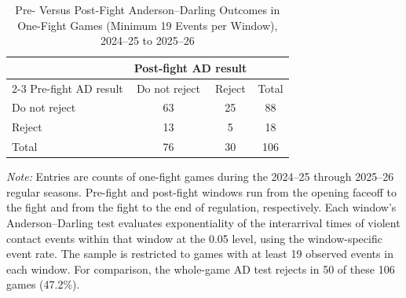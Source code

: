 \begin{table}[htbp]
\centering
\caption{Pre- Versus Post-Fight Anderson--Darling Outcomes in One-Fight Games (Minimum 19 Events per Window), 2024--25 to 2025--26}
\label{tab:one_fight_AD_rejection_min_19_20242025_20252026}
\small
\renewcommand{\arraystretch}{1.15}
\setlength{\tabcolsep}{6pt}

\begin{tabular*}{0.78\textwidth}{@{\extracolsep{\fill}}lccc}
\toprule
 & \multicolumn{2}{c}{Post-fight AD result} & \\
\cmidrule(lr){2-3}
Pre-fight AD result & Do not reject & Reject & Total \\
\midrule
Do not reject & 63 & 25 & 88 \\
Reject & 13 & 5 & 18 \\
\midrule
Total & 76 & 30 & 106 \\
\bottomrule
\end{tabular*}

\vspace{0.4em}
\parbox{0.78\textwidth}{
\footnotesize
\textit{Note:} Entries are counts of one-fight games during the 2024--25 through 2025--26 regular seasons. Pre-fight and post-fight windows run from the opening faceoff to the fight and from the fight to the end of regulation, respectively. Each window's Anderson--Darling test evaluates exponentiality of the interarrival times of violent contact events within that window at the 0.05 level, using the window-specific event rate. The sample is restricted to games with at least 19 observed events in each window. For comparison, the whole-game AD test rejects in 50 of these 106 games (47.2\%).
}
\end{table}
